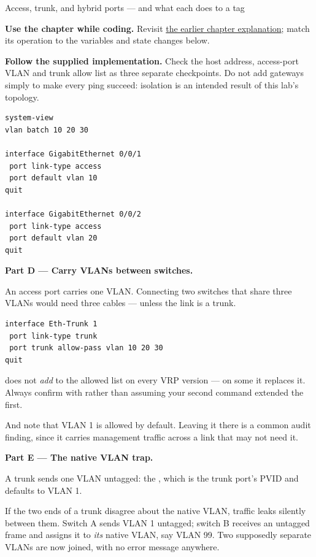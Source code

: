 \begin{labproject}{Access, trunk, and hybrid ports --- and what each does to a tag}



\textbf{Use the chapter while coding.} Revisit \hyperref[ch:vlan]{the earlier chapter explanation}; match its operation to the variables and state changes below.

\textbf{Follow the supplied implementation.} Check the host address, access-port VLAN and trunk allow list as three separate checkpoints. Do not add gateways simply to make every ping succeed: isolation is an intended result of this lab's topology.


\begin{lstlisting}[style=utpterminal]
system-view
vlan batch 10 20 30

interface GigabitEthernet 0/0/1
 port link-type access
 port default vlan 10
quit

interface GigabitEthernet 0/0/2
 port link-type access
 port default vlan 20
quit
\end{lstlisting}

\medskip\noindent\textbf{Part D --- Carry VLANs between switches.}\par
An access port carries one VLAN. Connecting two switches that share three VLANs would need three cables --- unless the link is a trunk.

\begin{lstlisting}[style=utpterminal]
interface Eth-Trunk 1
 port link-type trunk
 port trunk allow-pass vlan 10 20 30
quit
\end{lstlisting}

\begin{pitfall}
 does not \emph{add} to the allowed list on every VRP version --- on some it replaces it. Always confirm with  rather than assuming your second command extended the first.

And note that VLAN 1 is allowed by default. Leaving it there is a common audit finding, since it carries management traffic across a link that may not need it.
\end{pitfall}

\medskip\noindent\textbf{Part E --- The native VLAN trap.}\par

\begin{keyidea}
A trunk sends one VLAN untagged: the , which is the trunk port's PVID and defaults to VLAN 1.

If the two ends of a trunk disagree about the native VLAN, traffic leaks silently between them. Switch A sends VLAN 1 untagged; switch B receives an untagged frame and assigns it to \emph{its} native VLAN, say VLAN 99. Two supposedly separate VLANs are now joined, with no error message anywhere.


\end{keyidea}
\end{labproject}
